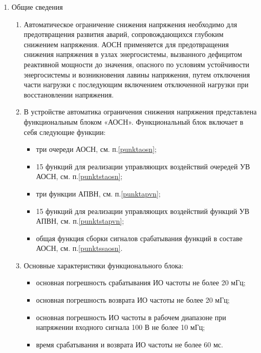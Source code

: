
\color{black}

\begin{enumerate}

\item Общие сведения

\begin{enumerate}

\item
Автоматическое ограничение снижения напряжения необходимо для предотвращения развития аварий, сопровождающихся глубоким снижением напряжения. АОСН применяется для предотвращения снижения напряжения в узлах энергосистемы, вызванного дефицитом реактивной мощности до значения, опасного по условиям устойчивости энергосистемы и возникновения лавины напряжения, путем отключения части нагрузки с последующим включением отключенной нагрузки при восстановлении напряжения. 

\item В устройстве автоматика ограничения снижения напряжения представлена функциональным блоком «АОСН». Функциональный блок включает в себя следующие функции:
\begin{itemize}
    \item три очереди АОСН, см. п.\ref{punktaosn};
    \item 15 функций для реализации управляющих воздействий очередей УВ АОСН, см. п.\ref{punktstaosn};
    \item три функции АПВН, см. п.\ref{punktapvn};
    \item 15 функций для реализации управляющих воздействий функций УВ АПВН, см. п.\ref{punktstapvn};
    \item общая функция сборки сигналов срабатывания функций в составе АОСН, см. п.\ref{punktssaosn}.   
\end{itemize}

\item
Основные характеристики функционального блока:
\begin{itemize}
    \item основная погрешность срабатывания ИО частоты не более 20 мГц;
    \item основная погрешность возврата ИО частоты не более 20 мГц;
    \item основная погрешность ИО частоты в рабочем диапазоне при напряжении входного сигнала 100 В не более 10 мГц;
    \item время срабатывания и возврата ИО частоты не более 60 мс.
\end{itemize}


\end{enumerate}
\end{enumerate}
